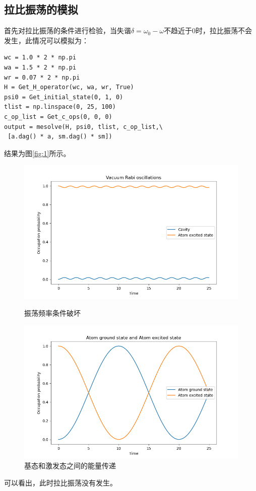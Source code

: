 \documentclass{ctexart}
\begin{document}
\subsection{拉比振荡的模拟}
首先对拉比振荡的条件进行检验，当失谐$\delta = \omega_0 - \omega$不趋近于0时，拉比振荡不会发生，此情况可以模拟为：

\begin{verbatim}
wc = 1.0 * 2 * np.pi
wa = 1.5 * 2 * np.pi
wr = 0.07 * 2 * np.pi
H = Get_H_operator(wc, wa, wr, True)
psi0 = Get_initial_state(0, 1, 0)
tlist = np.linspace(0, 25, 100)
c_op_list = Get_c_ops(0, 0, 0)
output = mesolve(H, psi0, tlist, c_op_list,\
 [a.dag() * a, sm.dag() * sm])
\end{verbatim}

结果为图\ref{fig:1}所示。
\begin{figure}[htbp]
    \begin{minipage}[t]{0.5\linewidth}
        \centering
        \includegraphics[width=1.0\linewidth]{1.png}
        \caption{振荡频率条件破坏}
        \label{fig:1}
    \end{minipage}    
    \begin{minipage}[t]{0.5\linewidth}
        \centering
        \includegraphics[width=1.0\linewidth]{2.png}
        \caption{基态和激发态之间的能量传递}
        \label{fig:2}
    \end{minipage}
\end{figure}
可以看出，此时拉比振荡没有发生。
\end{document}
